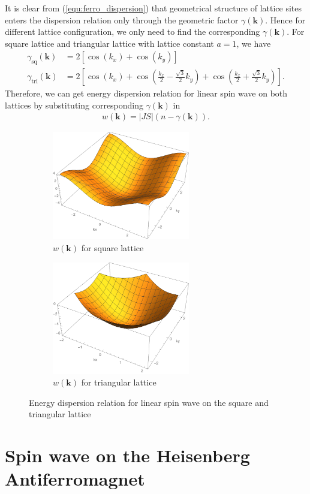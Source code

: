 \documentclass[a4paper,12pt]{article}
\begin{document}
		It is clear from (\ref{equ:ferro_dispersion}) that geometrical structure of lattice sites enters the dispersion relation only through the geometric factor $\gamma(\mathbf{k})$. Hence for different lattice configuration, we only need to find the corresponding $\gamma(\mathbf{k})$. For square lattice and triangular lattice with lattice constant $a=1$, we have 
		\begin{align}
			\gamma_{\text{sq}}(\mathbf{k})&=2\left[\cos(k_x)+\cos(k_y)\right]\\
			\gamma_{\text{tri}}(\mathbf{k})&=2\left[\cos(k_x)+\cos\left(\frac{k_x}{2}-\frac{\sqrt{3}}{2}k_y\right)+\cos\left(\frac{k_x}{2}+\frac{\sqrt{3}}{2}k_y\right)\right].
		\end{align}
		Therefore, we can get energy dispersion relation for linear spin wave on both lattices by substituting corresponding $\gamma(\mathbf{k})$ in
		\begin{align}
			w(\mathbf{k})=|JS|(n-\gamma(\mathbf{k})).
		\end{align}
				\begin{figure}[H]
			\centering
			\begin{subfigure}[b]{0.4\textwidth}
				\includegraphics[width=6cm,keepaspectratio]{sq_dispersion}
				\caption{$w(\mathbf{k})$ for square lattice }
				\label{fig:sq_dispersion}
			\end{subfigure}
			\quad
			\begin{subfigure}[b]{0.4\textwidth}
				\includegraphics[width=6cm,keepaspectratio]{tri_dispersion}
				\caption{$w(\mathbf{k})$ for triangular lattice }
				\label{fig:tri_dispersion}
			\end{subfigure}
			\caption{Energy dispersion relation for linear spin wave on the square and triangular lattice}
		\end{figure}
	\section{Spin wave on the Heisenberg Antiferromagnet}
\end{document}
